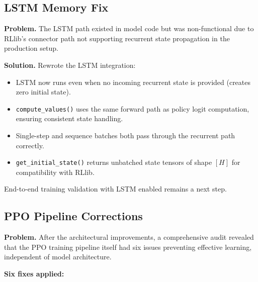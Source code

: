 \subsection{LSTM Memory Fix}
\label{sec:lstm_memory_fix}

\textbf{Problem.} The LSTM path existed in model code but was non-functional
due to RLlib's connector path not supporting recurrent state propagation in
the production setup.

\textbf{Solution.} Rewrote the LSTM integration:
\begin{itemize}
  \item LSTM now runs even when no incoming recurrent state is provided
        (creates zero initial state).
  \item \texttt{compute\_values()} uses the same forward path as policy logit
        computation, ensuring consistent state handling.
  \item Single-step and sequence batches both pass through the recurrent path
        correctly.
  \item \texttt{get\_initial\_state()} returns unbatched state tensors of shape
        $[H]$ for compatibility with RLlib.
\end{itemize}

End-to-end training validation with LSTM enabled remains a next step.

\subsection{PPO Pipeline Corrections}

\textbf{Problem.} After the architectural improvements, a comprehensive audit
revealed that the PPO training pipeline itself had six issues preventing
effective learning, independent of model architecture.

\textbf{Six fixes applied:}

